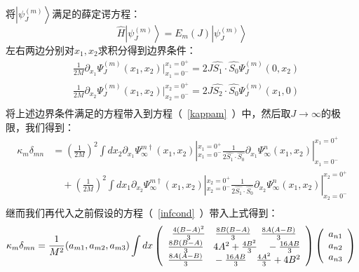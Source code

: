 将$\left|\psi^{(m)}_J\right>$满足的薛定谔方程：
\begin{equation}
\hat{H} \left|\psi^{(m)}_J\right> = E_m(J)\left|\psi^{(m)}_J\right>
\end{equation}
左右两边分别对$x_1,x_2$求积分得到边界条件：
    \begin{equation}
        \begin{split}
            &\frac{1}{2M}\partial_{x_1} \Psi^{(m)}_J(x_1,x_2)|_{x_1=0^-}^{x_1=0^+}= 2J \hat{S_1}\cdot \hat{S_0}\Psi^{(m)}_J(0,x_2) \\
            &\frac{1}{2M}\partial_{x_2} \Psi^{(m)}_J(x_1,x_2)|_{x_2=0^-}^{x_2=0^+}= 2J \hat{S_2}\cdot \hat{S_0} \Psi^{(m)}_J(x_1,0)\\
        \end{split}
    \end{equation}
将上述边界条件满足的方程带入到方程（~\ref{kappam}~）中，然后取$J\to\infty$的极限，我们得到：
\begin{equation}\label{kappammid}
    \begin{split}
            \kappa_m \delta_{mn} &=  (\frac{1}{2M})^2 \int dx_2 \partial_{x_1} \Psi^{m\dagger}_{\infty}(x_1,x_2) |^{x_1=0^+}_{x_1 = 0^-} \frac{1}{2\hat{S_1}\cdot \hat{S_0}} \partial_{x_1} \Psi^{n}_{\infty}(x_1,x_2) |^{x_1=0^+}_{x_1 = 0^-}\\
            & \quad +  (\frac{1}{2M})^2 \int dx_1 \partial_{x_2} \Psi^{m\dagger}_{\infty}(x_1,x_2) |^{x_2=0^+}_{x_2 = 0^-} \frac{1}{2\hat{S_1}\cdot \hat{S_0}} \partial_{x_2} \Psi^{n}_{\infty}(x_1,x_2) |^{x_2=0^+}_{x_2 = 0^-}\\
    \end{split}
\end{equation} 
继而我们再代入之前假设的方程（~\ref{infcond}~）带入上式得到：
\begin{equation}
           \kappa_m \delta_{mn} = \frac{1}{M^2}(a_{m1},a_{m2},a_{m3}) \int dx
            \left(
            \begin{array}{c}
                \frac{4(B-A)^2}{3} \quad \frac{8B(B-A)}{3}  \quad \frac{8A(A-B)}{3}\\
                \frac{8B(B-A)}{3} \quad 4 A^2+\frac{4 B^2}{3}  \quad -\frac{16AB}{3} \\
                \frac{8A(A-B)}{3} \quad  -\frac{16AB}{3} \quad \frac{4 A^2}{3}+4 B^2
            \end{array}
            \right) 
            \left(
            \begin{array}{c}
                a_{n1}\\
                a_{n2}\\
                a_{n3}\\
            \end{array}
            \right)\\
\end{equation}
